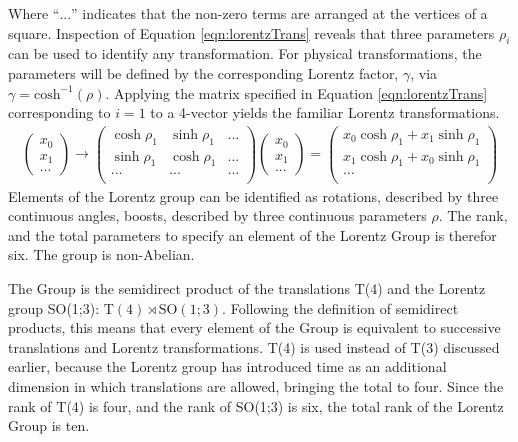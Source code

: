 Where ``$...$'' indicates that the non-zero terms are arranged at the vertices of a square.
Inspection of Equation \ref{eqn:lorentzTrans} reveals that three parameters $\rho_i$ can be used to identify any transformation.
For physical transformations, the parameters will be defined by the corresponding Lorentz factor, $\gamma$, via $\gamma=\text{cosh}^{-1}(\rho)$. \check
Applying the matrix specified in Equation \ref{eqn:lorentzTrans} corresponding to $i=1$ to a 4-vector yields the familiar Lorentz transformations.
\begin{equation}\begin{split}
\begin{pmatrix}x_0\\x_1\\...\end{pmatrix}\to
\begin{pmatrix}
    \cosh\rho_1 & \sinh\rho_1 & ... \\
    \sinh\rho_1 & \cosh\rho_1 & ... \\
    ... & ... & ... \\
\end{pmatrix}
\begin{pmatrix}x_0\\x_1\\...\end{pmatrix} =
\begin{pmatrix}
    x_0\cosh{\rho_1}+x_1\sinh{\rho_1} \\
    x_1\cosh{\rho_1}+x_0\sinh{\rho_1} \\
    ... \\
\end{pmatrix}
\end{split}\end{equation} 
Elements of the Lorentz group can be identified as rotations, described by three continuous angles, boosts, described by three continuous parameters $\rho$.
The rank, and the total parameters to specify an element of the Lorentz Group is therefor six.
The group is non-Abelian.

The \poincare Group is the semidirect product of the translations T(4) and the Lorentz group SO(1;3): $\text{T}(4)\rtimes\text{SO}(1;3)$.
Following the definition of semidirect products, this means that every element of the \poincare Group is equivalent to successive translations and Lorentz transformations.
T(4) is used instead of T(3) discussed earlier, because the Lorentz group has introduced time as an additional dimension in which translations are allowed, bringing the total to four.
Since the rank of T(4) is four, and the rank of SO(1;3) is six, the total rank of the Lorentz Group is ten.

